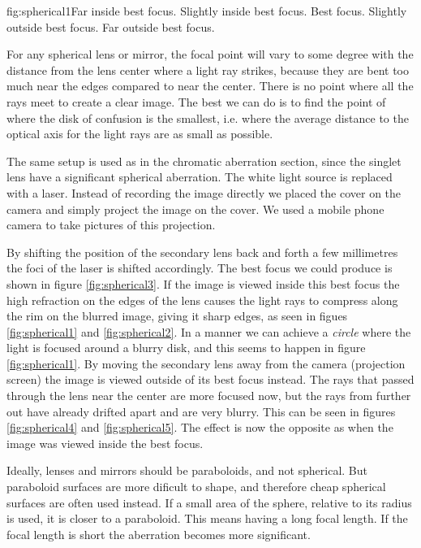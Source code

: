       {fig:spherical1}{Far inside best focus.}
      {Slightly inside best focus.}
      {Best focus.}
      {Slightly outside best focus.}
      {Far outside best focus.}

For any spherical lens or mirror, the focal point will vary to some degree with 
the distance from the lens center where a light ray strikes, because they are 
bent too much near the edges compared to near the center. There is no point 
where all the rays meet to create a clear image. The best we can do is to find 
the point of where the disk of confusion is the smallest, i.e. where the 
average distance to the optical axis for the light rays are as small as 
possible.

The same setup is used as in the chromatic aberration section, since the
singlet lens have a significant spherical aberration. The white light source is
replaced with a laser. Instead of recording the image directly we placed the
cover on the camera and simply project the image on the cover. We used a mobile
phone camera to take pictures of this projection.

By shifting the position of the secondary lens back and forth a few millimetres
the foci of the laser is shifted accordingly. The best focus we could produce
is shown in figure \vref{fig:spherical3}. If the image is viewed inside this
best focus the high refraction on the edges of the lens causes the light rays
to compress along the rim on the blurred image, giving it sharp edges, as seen
in figues \vref{fig:spherical1} and \vref{fig:spherical2}. In a manner we can
achieve a \emph{circle} where the light is focused around a blurry disk, and
this seems to happen in figure \ref{fig:spherical1}. By moving the secondary
lens away from the camera (projection screen) the image is viewed outside of
its best focus instead. The rays that passed through the lens near the center
are more focused now, but the rays from further out have already drifted apart
and are very blurry. This can be seen in figures \ref{fig:spherical4} and
\vref{fig:spherical5}. The effect is now the opposite as when the image was
viewed inside the best focus.

Ideally, lenses and mirrors should be paraboloids, and not spherical. But
paraboloid surfaces are more dificult to shape, and therefore cheap spherical
surfaces are often used instead. If a small area of the sphere, relative to its
radius is used, it is closer to a paraboloid. This means having a long focal
length. If the focal length is short the aberration becomes more significant.
